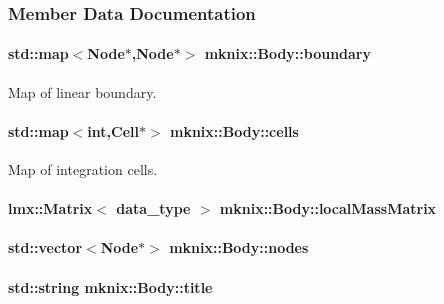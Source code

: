 \subsubsection{Member Data Documentation}
\hypertarget{classmknix_1_1_body_abaacc346d058cdabb8d0273b1440e323}{
\paragraph[{boundary}]{\setlength{\rightskip}{0pt plus 5cm}std\-::map$<${\bf Node}$\ast$,{\bf Node}$\ast$$>$ mknix\-::\-Body\-::boundary\hspace{0.3cm}{\ttfamily [protected]}}}\label{classmknix_1_1_body_abaacc346d058cdabb8d0273b1440e323}
Map of linear boundary. \hypertarget{classmknix_1_1_body_afa538e2bc24cd6623e63b44704037a73}{
\paragraph[{cells}]{\setlength{\rightskip}{0pt plus 5cm}std\-::map$<$int,{\bf Cell}$\ast$$>$ mknix\-::\-Body\-::cells\hspace{0.3cm}{\ttfamily [protected]}}}\label{classmknix_1_1_body_afa538e2bc24cd6623e63b44704037a73}
Map of integration cells. \hypertarget{classmknix_1_1_body_abf69d9fd5ede2c511d85c5d644902c6e}{
\paragraph[{local\-Mass\-Matrix}]{\setlength{\rightskip}{0pt plus 5cm}lmx\-::\-Matrix$<$ {\bf data\-\_\-type} $>$ mknix\-::\-Body\-::local\-Mass\-Matrix\hspace{0.3cm}{\ttfamily [protected]}}}\label{classmknix_1_1_body_abf69d9fd5ede2c511d85c5d644902c6e}
\hypertarget{classmknix_1_1_body_a3393da3459cbf7b35ee3dedb982180bf}{
\paragraph[{nodes}]{\setlength{\rightskip}{0pt plus 5cm}std\-::vector$<${\bf Node}$\ast$$>$ mknix\-::\-Body\-::nodes\hspace{0.3cm}{\ttfamily [protected]}}}\label{classmknix_1_1_body_a3393da3459cbf7b35ee3dedb982180bf}
\hypertarget{classmknix_1_1_body_a3c05cdff2d5f2b150046cd734d0ed7ce}{
\paragraph[{title}]{\setlength{\rightskip}{0pt plus 5cm}std\-::string mknix\-::\-Body\-::title\hspace{0.3cm}{\ttfamily [protected]}}}\label{classmknix_1_1_body_a3c05cdff2d5f2b150046cd734d0ed7ce}


